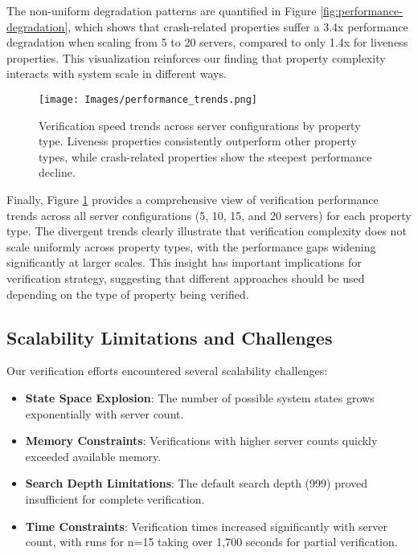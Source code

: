 The non-uniform degradation patterns are quantified in Figure \ref{fig:performance-degradation}, which shows that crash-related properties suffer a 3.4x performance degradation when scaling from 5 to 20 servers, compared to only 1.4x for liveness properties. This visualization reinforces our finding that property complexity interacts with system scale in different ways.

\begin{figure}[htbp]
    \centering
    \texttt{[image: Images/performance\_trends.png]}
    \caption{Verification speed trends across server configurations by property type. Liveness properties consistently outperform other property types, while crash-related properties show the steepest performance decline.}
    \label{fig:performance-trends}
\end{figure}

Finally, Figure \ref{fig:performance-trends} provides a comprehensive view of verification performance trends across all server configurations (5, 10, 15, and 20 servers) for each property type. The divergent trends clearly illustrate that verification complexity does not scale uniformly across property types, with the performance gaps widening significantly at larger scales. This insight has important implications for verification strategy, suggesting that different approaches should be used depending on the type of property being verified.

\subsection{Scalability Limitations and Challenges}
\label{sec:scalability}

Our verification efforts encountered several scalability challenges:

\begin{itemize}
    \item \textbf{State Space Explosion}: The number of possible system states grows exponentially with server count.
    
    \item \textbf{Memory Constraints}: Verifications with higher server counts quickly exceeded available memory.
    
    \item \textbf{Search Depth Limitations}: The default search depth (999) proved insufficient for complete verification.
    
    \item \textbf{Time Constraints}: Verification times increased significantly with server count, with runs for n=15 taking over 1,700 seconds for partial verification.
\end{itemize}


